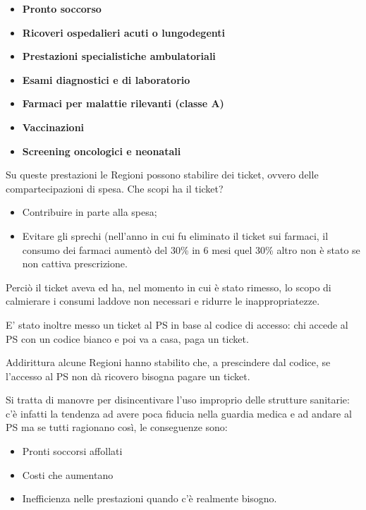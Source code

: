 \begin{itemize}
\item
  \textbf{Pronto soccorso}
\item
  \textbf{Ricoveri ospedalieri acuti o lungodegenti}
\item
  \textbf{Prestazioni specialistiche ambulatoriali}
\item
  \textbf{Esami diagnostici e di laboratorio}
\item
  \textbf{Farmaci per malattie rilevanti (classe A)}
\item
  \textbf{Vaccinazioni}
\item
  \textbf{Screening oncologici e neonatali}
\end{itemize}

Su queste prestazioni le Regioni possono stabilire dei ticket, ovvero delle compartecipazioni di spesa. Che scopi ha il ticket?

\begin{itemize}
\item
  Contribuire in parte alla spesa;
\item
  Evitare gli sprechi (nell'anno in cui fu eliminato il ticket sui
  farmaci, il consumo dei farmaci aumentò del 30\% in 6 mesi quel 30\%
  altro non è stato se non cattiva prescrizione.
\end{itemize}

Perciò il ticket aveva ed ha, nel momento in cui è stato rimesso, lo scopo di calmierare i consumi laddove non necessari e ridurre le inappropriatezze.

E' stato inoltre messo un ticket al PS in base al codice di accesso: chi accede al PS con un codice bianco e poi va a casa, paga un ticket.

Addirittura alcune Regioni hanno stabilito che, a prescindere dal codice, se l'accesso al PS non dà ricovero bisogna pagare un ticket.

Si tratta di manovre per disincentivare l'uso improprio delle strutture sanitarie: c'è infatti la tendenza ad avere poca fiducia nella guardia medica e ad andare al PS ma se tutti ragionano così, le conseguenze sono:

\begin{itemize}
\item
  Pronti soccorsi affollati
\item
  Costi che aumentano
\item
  Inefficienza nelle prestazioni quando c'è realmente bisogno.
\end{itemize}


